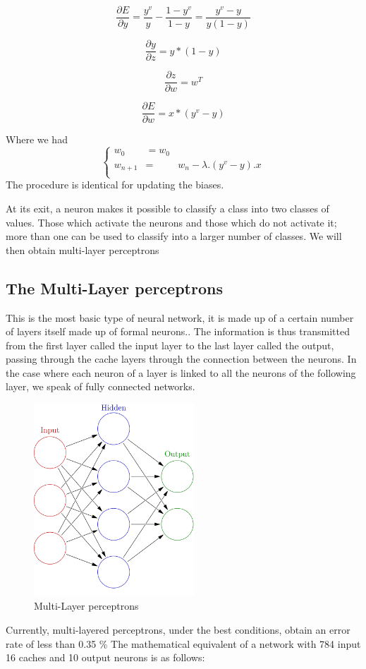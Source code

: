 \documentclass[twoside,twocolumn]{article}
\begin{document}
\[ \frac{\partial E}{\partial y}
  =  \frac{y^v}{y} - \frac{1-y^v}{1-y}
  = \frac{y^v - y}{y(1 - y)} \]

\[ \frac{\partial y}{\partial z}
  =  y*(1-y) \]

\[ \frac{\partial z}{\partial w}
  =  w^T \]

\[ \frac{\partial E}{\partial w}
  = x*(y^v-y) \]

Where we had 
\[\left\{
  \begin{array}{rcr}
    w_{0} & =  w_0 \\
    w_{n+1} & = & w_{n} - \lambda.(y^v-y).x\\
  \end{array}
\right.\]
The procedure is identical for updating the biases.

At its exit, a neuron makes it possible to classify a class into two classes of values. Those which activate the neurons and those which do 
not activate it; more than one can be used to classify into a larger number of classes. We will then obtain multi-layer perceptrons

\subsection{The Multi-Layer perceptrons}
This is the most basic type of neural network, it is made up of a certain number of layers itself made up of formal neurons.\cite{warren1}. 
The information is thus transmitted from the first layer called the input layer to the last layer called the output, passing through the cache 
layers through the connection between the neurons. In the case where each neuron of a layer is linked to all the neurons of the following 
layer, we speak of fully connected networks.

\begin{figure}[h]
  \centering
  \includegraphics[width=60mm]{Colored_neural_network.png}
  \caption{Multi-Layer perceptrons}
  \label{PerceptronMulticouche}
  \end{figure}
Currently, multi-layered perceptrons, under the best conditions, obtain an error rate of less than 0.35 \%\cite{DeepBig} The mathematical equivalent 
of a network with 784 input 16 caches and 10 output neurons is as follows:
\end{document}
